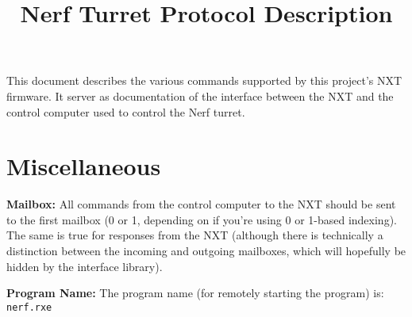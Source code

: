 \documentclass{article}
\title{Nerf Turret Protocol Description}
\author{}
\date{}
\begin{document}
	\maketitle

	This document describes the various commands supported by this project's NXT firmware.
	It server as documentation of the interface between the NXT and the control computer used to control the Nerf turret.

	\section{Miscellaneous}
	\textbf{Mailbox:} All commands from the control computer to the NXT should be sent to the first mailbox (0 or 1, depending on if you're using 0 or 1-based indexing).
	The same is true for responses from the NXT (although there is technically a distinction between the incoming and outgoing mailboxes, which will hopefully
	be hidden by the interface library).

	\noindent
	\textbf{Program Name:} The program name (for remotely starting the program) is: \texttt{nerf.rxe}
\end{document}
